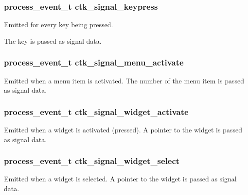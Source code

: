 \subsubsection[{ctk\+\_\+signal\+\_\+keypress}]{\setlength{\rightskip}{0pt plus 5cm}process\+\_\+event\+\_\+t ctk\+\_\+signal\+\_\+keypress}\label{group__ctkevents_ga516fdcf33758900be278d0e448635b9d}
Emitted for every key being pressed.

The key is passed as signal data. \hypertarget{group__ctkevents_gaa56be046241082d23581812190f2bef5}{}
\subsubsection[{ctk\+\_\+signal\+\_\+menu\+\_\+activate}]{\setlength{\rightskip}{0pt plus 5cm}process\+\_\+event\+\_\+t ctk\+\_\+signal\+\_\+menu\+\_\+activate}\label{group__ctkevents_gaa56be046241082d23581812190f2bef5}
Emitted when a menu item is activated. The number of the menu item is passed as signal data. \hypertarget{group__ctkevents_gaf2f104ce01e5e229f9eba8e2f367c591}{}
\subsubsection[{ctk\+\_\+signal\+\_\+widget\+\_\+activate}]{\setlength{\rightskip}{0pt plus 5cm}process\+\_\+event\+\_\+t ctk\+\_\+signal\+\_\+widget\+\_\+activate}\label{group__ctkevents_gaf2f104ce01e5e229f9eba8e2f367c591}
Emitted when a widget is activated (pressed). A pointer to the widget is passed as signal data. \hypertarget{group__ctkevents_ga84a8111d8df809f10e8ad81bc47edc3a}{}
\subsubsection[{ctk\+\_\+signal\+\_\+widget\+\_\+select}]{\setlength{\rightskip}{0pt plus 5cm}process\+\_\+event\+\_\+t ctk\+\_\+signal\+\_\+widget\+\_\+select}\label{group__ctkevents_ga84a8111d8df809f10e8ad81bc47edc3a}
Emitted when a widget is selected. A pointer to the widget is passed as signal data. \hypertarget{group__ctkevents_gab92e76646299dbab7216ab1f9dcef9e5}{}

